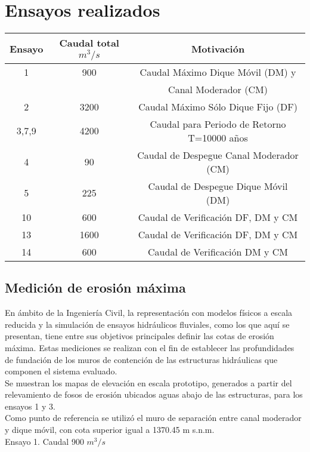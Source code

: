\section{Ensayos realizados}

\begin{tabular}{ccc}
\hline
Ensayo  & Caudal total $m^{3}/s$ & Motivación \\
\hline
1 & 900 & Caudal Máximo Dique Móvil (DM) y \\
  &     & Canal Moderador (CM) \\
\hline
2 & 3200 & Caudal Máximo Sólo Dique Fijo (DF) \\
\hline
3,7,9 & 4200 & Caudal para Periodo de Retorno T=10000 años \\
\hline
4 & 90 & Caudal de Despegue Canal Moderador (CM) \\
\hline
5 & 225 & Caudal de Despegue Dique Móvil (DM) \\
\hline
10 & 600 & Caudal de Verificación DF, DM y CM
 \\
\hline
13 & 1600 & Caudal de Verificación DF, DM y CM
 \\
\hline
14 & 600 & Caudal de Verificación DM y CM
 \\
\hline
\end{tabular}

\subsection{Medición de erosión máxima}
\label{sec:ensayo-erosion-maxima}

En ámbito de la Ingeniería Civil, la representación con modelos físicos a escala reducida y la simulación de ensayos hidráulicos fluviales, como los que aquí se presentan, tiene entre sus objetivos principales definir las cotas de erosión máxima. Estas mediciones se realizan con el fin de establecer las profundidades de fundación de los muros de contención de las estructuras hidráulicas que componen el sistema evaluado. \\
Se muestran los mapas de elevación en escala prototipo, generados a partir del relevamiento de fosos de erosión ubicados aguas abajo de las estructuras, para los ensayos 1 y 3. \\
Como punto de referencia se utilizó el muro de separación entre canal moderador y dique móvil, con cota superior igual a 1370.45 m s.n.m.\\

Ensayo 1. Caudal 900 $m^{3}/s$ \\

